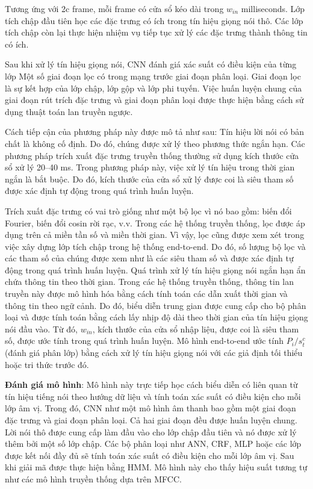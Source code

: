 \documentclass{article}
\begin{document}
	Tương ứng với 2c frame, mỗi frame có cửa sổ kéo dài trong $w_{in}$ milliseconds. Lớp tích chập đầu tiên học các đặc trưng có ích trong tín hiệu giọng nói thô. Các lớp tích chập còn lại thực hiện nhiệm vụ tiếp tục xử lý các đặc trưng thành thông tin có ích. 
	
	Sau khi xử lý tín hiệu giọng nói, CNN đánh giá xác suất có điều kiện của từng lớp  Một số giai đoạn lọc có trong mạng trước giai đoạn phân loại. Giai đoạn lọc là sự kết hợp của lớp chập, lớp gộp và lớp phi tuyến. Việc huấn luyện chung của giai đoạn rút trích đặc trưng và giai đoạn phân loại được thực hiện bằng cách sử dụng thuật toán lan truyền ngược.
	
	Cách tiếp cận của phương pháp này được mô tả như sau: Tín hiệu lời nói có bản chất là không cố định. Do đó, chúng được xử lý theo phương thức ngắn hạn. Các phương pháp trích xuất đặc trưng truyền thống thường sử dụng kích thước cửa sổ xử lý 20–40 ms. Trong phương pháp này, việc xử lý tín hiệu trong thời gian ngắn là bắt buộc. Do đó, kích thước của cửa sổ xử lý được coi là siêu tham số được xác định tự động trong quá trình huấn luyện. 
	
	Trích xuất đặc trưng có vai trò giống như một bộ lọc vì nó bao gồm: biến đổi Fourier, biến đổi cosin rời rạc, v.v. Trong các hệ thống truyền thống, lọc được áp dụng trên cả miền tần số và miền thời gian. Vì vậy, lọc cũng được xem xét trong việc xây dựng lớp tích chập trong hệ thống end-to-end. Do đó, số lượng bộ lọc và các tham số của chúng được xem như là các siêu tham số và được xác định tự động trong quá trình huấn luyện. Quá trình xử lý tín hiệu giọng nói ngắn hạn ẩn chứa thông tin theo thời gian. Trong các hệ thống truyền thống, thông tin lan truyền này được mô hình hóa bằng cách tính toán các dẫn xuất thời gian và thông tin theo ngữ cảnh. Do đó, biểu diễn trung gian được cung cấp cho bộ phân loại và được tính toán bằng cách lấy nhịp độ dài theo thời gian của tín hiệu giọng nói đầu vào. Từ đó, $w_{in}$, kích thước của cửa sổ nhập liệu, được coi là siêu tham số, được ước tính trong quá trình huấn luyện. Mô hình end-to-end ước tính $P_i / s_t^c$ (đánh giá phân lớp) bằng cách xử lý tín hiệu giọng nói với các giả định tối thiểu hoặc tri thức trước đó.
	
	\textbf{Đánh giá mô hình}: Mô hình này trực tiếp học cách biểu diễn có liên quan từ tín hiệu tiếng nói theo hướng dữ liệu và tính toán xác suất có điều kiện cho mỗi lớp âm vị. Trong đó, CNN như một mô hình âm thanh bao gồm một giai đoạn đặc trưng và giai đoạn phân loại. Cả hai giai đoạn đều được huấn luyện chung. Lời nói thô được cung cấp làm đầu vào cho lớp chập đầu tiên và nó được xử lý thêm bởi một số lớp chập. Các bộ phân loại như ANN, CRF, MLP hoặc các lớp được kết nối đầy đủ sẽ tính toán xác suất có điều kiện cho mỗi lớp âm vị. Sau khi giải mã được thực hiện bằng HMM. Mô hình này cho thấy hiệu suất tương tự như các mô hình truyền thống dựa trên MFCC.
	
\end{document}
